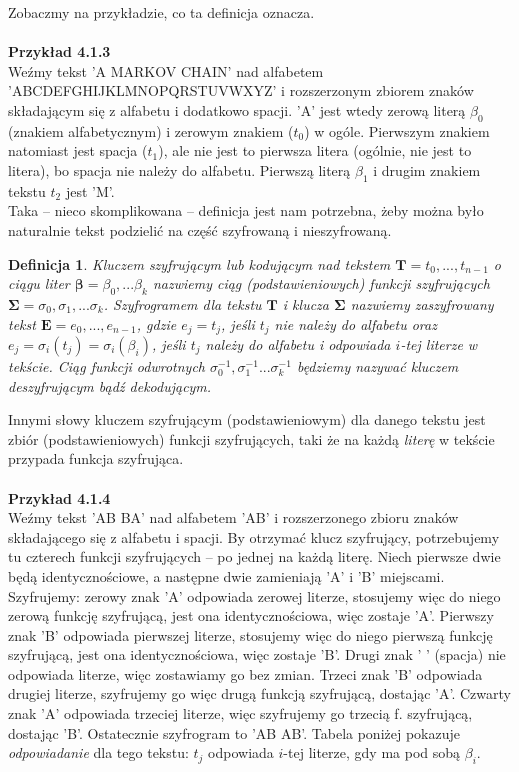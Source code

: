 \documentclass[a4paper]{article}
\theoremstyle{defn}
\newtheorem{defn}{Definicja}[subsection]
\theoremstyle{theorem}
\theoremstyle{lemma}
\theoremstyle{cor}
\theoremstyle{fact}
\begin{document}
Zobaczmy na przykładzie, co ta definicja oznacza. \\\\
\textbf{Przykład 4.1.3}\\ Weźmy tekst 'A MARKOV CHAIN' nad alfabetem 'ABCDEFGHIJKLMNOPQRSTUVWXYZ' i rozszerzonym zbiorem znaków składającym się z alfabetu i dodatkowo spacji. 'A' jest wtedy zerową literą $\beta_0$ (znakiem alfabetycznym) i zerowym znakiem ($t_0$) w ogóle. Pierwszym znakiem natomiast jest spacja ($t_1$), ale nie jest to pierwsza litera (ogólnie, nie jest to litera), bo spacja nie należy do alfabetu. Pierwszą literą $\beta_1$ i drugim znakiem tekstu $t_2$ jest 'M'.\\

Taka – nieco skomplikowana – definicja jest nam potrzebna, żeby można było naturalnie tekst podzielić na część szyfrowaną i nieszyfrowaną.
\begin{defn}\label{defn4.1.4}
\textit{Kluczem szyfrującym} lub \textit{kodującym} nad tekstem $\boldsymbol{T} = t_0, ..., t_{n-1}$ o ciągu liter $\boldsymbol{\beta} = \beta_0, ... \beta_{k}$ nazwiemy ciąg (podstawieniowych) funkcji szyfrujących $\boldsymbol{\Sigma} = \sigma_0, \sigma_1, ... \sigma_k$. \textit{Szyfrogramem} dla tekstu $\boldsymbol{T}$ i klucza $\boldsymbol{\Sigma}$ nazwiemy zaszyfrowany tekst $\boldsymbol{E} = e_0, ..., e_{n-1}$, gdzie $e_j = t_j$, jeśli $t_j$ nie należy do alfabetu oraz $e_j = \sigma_i(t_j) = \sigma_i(\beta_i)$, jeśli $t_j$ należy do alfabetu i odpowiada $i$-tej literze w tekście. Ciąg funkcji odwrotnych $\sigma_0^{-1}, \sigma_1^{-1} ... \sigma_k^{-1}$ będziemy nazywać \textit{kluczem deszyfrującym} bądź \textit{dekodującym}.
\end{defn}
Innymi słowy kluczem szyfrującym (podstawieniowym) dla danego tekstu jest zbiór (podstawieniowych) funkcji szyfrujących, taki że na każdą \textit{literę} w tekście przypada funkcja szyfrująca. \\\\
\textbf{Przykład 4.1.4}\\
Weźmy tekst 'AB BA' nad alfabetem 'AB' i rozszerzonego zbioru znaków składającego się z alfabetu i spacji. By otrzymać klucz szyfrujący, potrzebujemy tu czterech funkcji szyfrujących – po jednej na każdą literę. Niech pierwsze dwie będą identycznościowe, a następne dwie zamieniają 'A' i 'B' miejscami. Szyfrujemy: zerowy znak 'A' odpowiada zerowej literze, stosujemy więc do niego zerową funkcję szyfrującą, jest ona identycznościowa, więc zostaje 'A'. Pierwszy znak 'B' odpowiada pierwszej literze, stosujemy więc do niego pierwszą funkcję szyfrującą, jest ona identycznościowa, więc zostaje 'B'. Drugi znak ' ' (spacja) nie odpowiada literze, więc zostawiamy go bez zmian. Trzeci znak 'B' odpowiada drugiej literze, szyfrujemy go więc drugą funkcją szyfrującą, dostając 'A'. Czwarty znak 'A' odpowiada trzeciej literze, więc szyfrujemy go trzecią f. szyfrującą, dostając 'B'. Ostatecznie szyfrogram to 'AB AB'. Tabela poniżej pokazuje \textit{odpowiadanie} dla tego tekstu: $t_j$ odpowiada $i$-tej literze, gdy ma pod sobą $\beta_i$.
\end{document}
